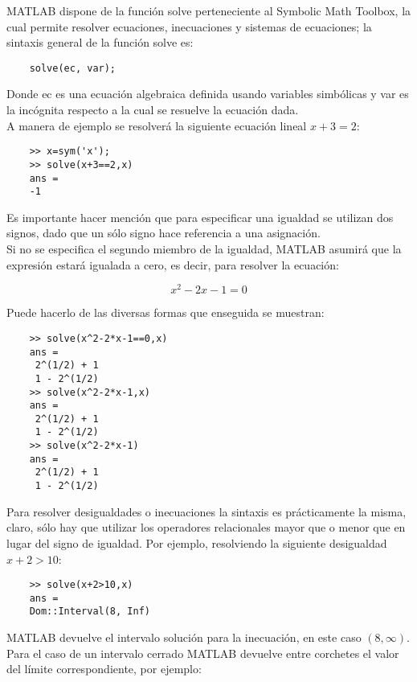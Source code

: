 MATLAB dispone de la función solve perteneciente al Symbolic Math Toolbox, la cual permite 
resolver ecuaciones, inecuaciones y sistemas de ecuaciones; la sintaxis general de 
la función solve es:
	
\begin{verbatim}
	solve(ec, var);
\end{verbatim}

Donde ec es una ecuación algebraica definida usando variables simbólicas y var es la 
incógnita respecto a la cual se resuelve la ecuación dada.\\

A manera de ejemplo se resolverá la siguiente ecuación lineal $ x+3=2 $:

\begin{verbatim}
	>> x=sym('x');
	>> solve(x+3==2,x)
	ans =
	-1
\end{verbatim}

Es importante hacer mención que para especificar una igualdad se utilizan dos signos, 
dado que un sólo signo hace referencia a una asignación.\\

Si no se especifica el segundo miembro de la igualdad, MATLAB asumirá que la expresión 
estará igualada a cero, es decir, para resolver la ecuación:

$$ x^2-2x-1=0 $$

Puede hacerlo de las diversas formas que enseguida se muestran:

\begin{verbatim}
	>> solve(x^2-2*x-1==0,x)
	ans =
	 2^(1/2) + 1
	 1 - 2^(1/2)
	>> solve(x^2-2*x-1,x)
	ans =
	 2^(1/2) + 1
	 1 - 2^(1/2)
	>> solve(x^2-2*x-1)
	ans =
	 2^(1/2) + 1
	 1 - 2^(1/2)
\end{verbatim}

Para resolver desigualdades o inecuaciones la sintaxis es prácticamente la misma, claro, 
sólo hay que utilizar los operadores relacionales mayor que o menor que en lugar del signo 
de igualdad. Por ejemplo, resolviendo la siguiente desigualdad $x+2>10$:

\begin{verbatim}
	>> solve(x+2>10,x)
	ans =
	Dom::Interval(8, Inf)
\end{verbatim}

MATLAB devuelve el intervalo solución para la inecuación, en este caso $(8,\infty)$. Para el caso 
de un intervalo cerrado MATLAB devuelve entre corchetes el valor del límite correspondiente, 
por ejemplo:

